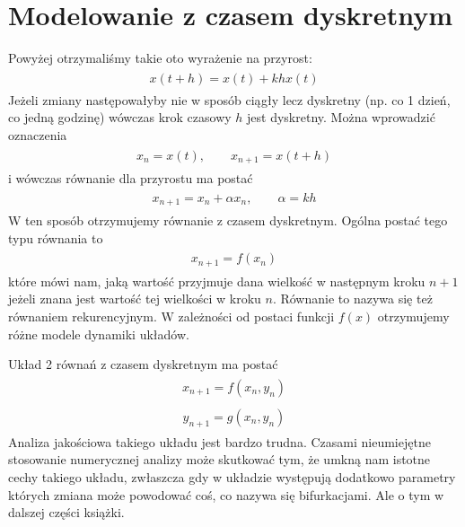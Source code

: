 \documentclass[a4paper,12pt,polish]{sphinxmanual}
\begin{document}
\section{Modelowanie z czasem dyskretnym}
\label{ch1/chI011:modelowanie-z-czasem-dyskretnym}
Powyżej otrzymaliśmy takie oto wyrażenie na przyrost:
\label{ch1/chI011:equation-eqn28}\begin{gather}
\begin{split}x(t+h) = x(t) + k h x(t)\end{split}\label{ch1/chI011-eqn28}
\end{gather}
Jeżeli zmiany następowałyby nie w sposób ciągły  lecz dyskretny (np.  co 1 dzień, co jedną godzinę) wówczas  krok czasowy $h$ jest dyskretny. Można wprowadzić oznaczenia
\label{ch1/chI011:equation-eqn29}\begin{gather}
\begin{split}x_n = x(t), \quad \quad x_{n+1} = x(t+h)\end{split}\label{ch1/chI011-eqn29}
\end{gather}
i wówczas równanie dla przyrostu ma postać
\label{ch1/chI011:equation-eqn30}\begin{gather}
\begin{split}x_{n+1} = x_n + \alpha x_n, \quad \quad \alpha = k h\end{split}\label{ch1/chI011-eqn30}
\end{gather}
W ten sposób otrzymujemy równanie z czasem dyskretnym. Ogólna postać tego typu równania to
\label{ch1/chI011:equation-eqn31}\begin{gather}
\begin{split}x_{n+1} = f(x_n)\end{split}\label{ch1/chI011-eqn31}
\end{gather}
które mówi nam, jaką wartość przyjmuje dana wielkość w następnym kroku $n+1$ jeżeli znana jest wartość tej wielkości w kroku $n$. Równanie to nazywa się też równaniem rekurencyjnym. W zależności od postaci funkcji $f(x)$ otrzymujemy różne modele dynamiki układów.

Układ 2 równań z czasem dyskretnym ma postać
\label{ch1/chI011:equation-eqn32}\begin{gather}
\begin{split}x_{n+1} = f(x_n, y_n)\end{split}\label{ch1/chI011-eqn32}
\end{gather}\label{ch1/chI011:equation-eqn33}\begin{gather}
\begin{split}y_{n+1} = g(x_n, y_n)\end{split}\label{ch1/chI011-eqn33}
\end{gather}
Analiza jakościowa takiego układu jest bardzo trudna. Czasami  nieumiejętne stosowanie numerycznej analizy może skutkować tym, że umkną nam istotne cechy takiego układu, zwłaszcza gdy w układzie  występują dodatkowo  parametry których zmiana może powodować coś, co nazywa się bifurkacjami.  Ale o tym w dalszej części książki.
\end{document}
